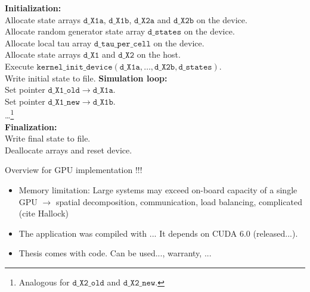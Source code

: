 \begin{algorithm}[H]
\DontPrintSemicolon
\textbf{Initialization:} \\
Allocate state arrays $\mathtt{d\_X1a}$, $\mathtt{d\_X1b}$, $\mathtt{d\_X2a}$ and $\mathtt{d\_X2b}$ on the device. \\
Allocate random generator state array $\mathtt{d\_states}$ on the device. \\
Allocate local tau array $\mathtt{d\_tau\_per\_cell}$ on the device. \\
Allocate state arrays $\mathtt{d\_X1}$ and $\mathtt{d\_X2}$ on the host. \\
Execute $\mathtt{kernel\_init\_device(d\_X1a,\ldots,d\_X2b,d\_states)}$. \\
Write initial state to file.\;
\textbf{Simulation loop:}\\
Set pointer $\mathtt{d\_X1\_old} \rightarrow \mathtt{d\_X1a}$. \\
Set pointer $\mathtt{d\_X1\_new} \rightarrow \mathtt{d\_X1b}$.  \\
\ldots\footnote{Analogous for $\mathtt{d\_X2\_old}$ and $\mathtt{d\_X2\_new}$.}\\
\textbf{Finalization:} \\
Write final state to file. \\
Deallocate arrays and reset device. \;
\caption{Overview for GPU implementation !!!}
\label{alg:pseudogpu}
\end{algorithm}

\ifdebug
\begin{itemize}
\item Memory limitation: Large systems may exceed on-board capacity of a single GPU $\rightarrow$ spatial decomposition, communication, load balancing, complicated (cite Hallock)
\item The application was compiled with ... It depends on CUDA 6.0 (released...).
\item Thesis comes with code. Can be used..., warranty, ...
\end{itemize}
\fi